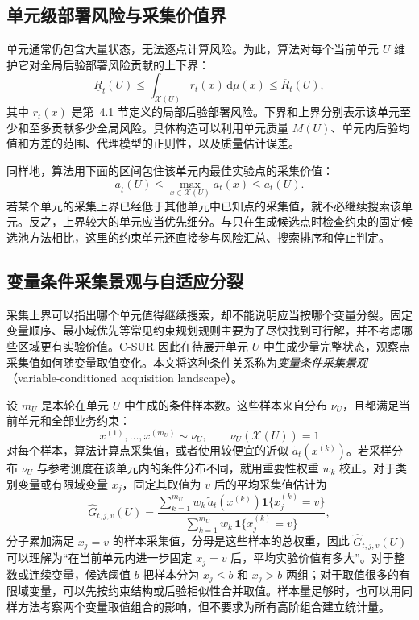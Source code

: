 \documentclass[UTF8,11pt,a4paper,fontset=none]{ctexart}
\newcommand{\X}{\mathcal X}
\newcommand{\1}{\mathbf 1}
\begin{document}
\subsection{单元级部署风险与采集价值界}

单元通常仍包含大量状态，无法逐点计算风险。为此，算法对每个当前单元 $U$ 维护它对全局后验部署风险贡献的上下界：
\begin{equation}
  \underline R_t(U)
  \leq
  \int_{\X(U)}r_t(x)\,\mathrm d\mu(x)
  \leq
  \overline R_t(U),
  \label{eq:cell-risk-bound}
\end{equation}
其中 $r_t(x)$ 是第~4.1 节定义的局部后验部署风险。下界和上界分别表示该单元至少和至多贡献多少全局风险。具体构造可以利用单元质量 $M(U)$、单元内后验均值和方差的范围、代理模型的正则性，以及质量估计误差。

同样地，算法用下面的区间包住该单元内最佳实验点的采集价值：
\begin{equation}
  \underline a_t(U)
  \leq
  \max_{x\in\X(U)}a_t(x)
  \leq
  \overline a_t(U).
  \label{eq:cell-acq-bound}
\end{equation}
若某个单元的采集上界已经低于其他单元中已知点的采集值，就不必继续搜索该单元。反之，上界较大的单元应当优先细分。与只在生成候选点时检查约束的固定候选池方法相比，这里的约束单元还直接参与风险汇总、搜索排序和停止判定。

\subsection{变量条件采集景观与自适应分裂}

采集上界可以指出哪个单元值得继续搜索，却不能说明应当按哪个变量分裂。固定变量顺序、最小域优先等常见约束规划规则主要为了尽快找到可行解，并不考虑哪些区域更有实验价值。C-SUR 因此在待展开单元 $U$ 中生成少量完整状态，观察点采集值如何随变量取值变化。本文将这种条件关系称为\emph{变量条件采集景观}（variable-conditioned acquisition landscape）。

设 $m_U$ 是本轮在单元 $U$ 中生成的条件样本数。这些样本来自分布 $\nu_U$，且都满足当前单元和全部业务约束：
\begin{equation}
  x^{(1)},\ldots,x^{(m_U)}
  \sim \nu_U,
  \qquad \nu_U(\X(U))=1
  \label{eq:landscape-sampling}
\end{equation}
对每个样本，算法计算点采集值，或者使用较便宜的近似 $\widetilde a_t(x^{(k)})$。若采样分布 $\nu_U$ 与参考测度在该单元内的条件分布不同，就用重要性权重 $w_k$ 校正。对于类别变量或有限域变量 $x_j$，固定其取值为 $v$ 后的平均采集值估计为
\begin{equation}
  \widehat G_{t,j,v}(U)
  =
  \frac{
    \sum_{k=1}^{m_U}w_k\,
    \widetilde a_t(x^{(k)})
    \1\{x_j^{(k)}=v\}}
  {
    \sum_{k=1}^{m_U}w_k\,
    \1\{x_j^{(k)}=v\}}
  ,
  \label{eq:variable-landscape}
\end{equation}
分子累加满足 $x_j=v$ 的样本采集值，分母是这些样本的总权重，因此 $\widehat G_{t,j,v}(U)$ 可以理解为“在当前单元内进一步固定 $x_j=v$ 后，平均实验价值有多大”。对于整数或连续变量，候选阈值 $b$ 把样本分为 $x_j\leq b$ 和 $x_j>b$ 两组；对于取值很多的有限域变量，可以先按约束结构或后验相似性合并取值。样本量足够时，也可以用同样方法考察两个变量取值组合的影响，但不要求为所有高阶组合建立统计量。
\end{document}
